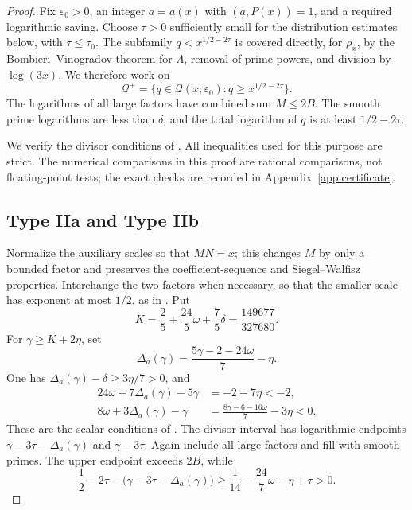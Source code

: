 \documentclass[11pt,reqno]{amsart}
\theoremstyle{definition}
\theoremstyle{remark}
\numberwithin{equation}{section}
\newcommand{\Qset}{\mathcal Q}
\newcommand{\tmax}{\tau_0}
\begin{document}
\begin{proof}
Fix $\varepsilon_0>0$, an integer $a=a(x)$ with $(a,P(x))=1$, and a
required logarithmic saving. Choose $\tau>0$ sufficiently small for the distribution estimates below, with
$\tau\le\tmax$. The subfamily $q<x^{1/2-2\tau}$ is covered directly,
for $\rho_x$, by the Bombieri--Vinogradov theorem for $\Lambda$, removal
of prime powers, and division by $\log(3x)$. We therefore
work on
\[
 \Qset^+=\{q\in\Qset(x;\varepsilon_0):q\ge x^{1/2-2\tau}\}.
\]
The logarithms of all large factors have combined sum $M\le2B$.
The smooth prime logarithms are less than $\delta$, and the total
logarithm of $q$ is at least $1/2-2\tau$.

We verify the divisor conditions of
\cite[Lemmas~3, 4, 6, and~7]{Stadlmann26}. All inequalities used for this purpose
are strict. The numerical comparisons in this proof are rational
comparisons, not floating-point tests; the exact checks are recorded in
Appendix~\ref{app:certificate}.

\subsection*{Type IIa and Type IIb}
Normalize the auxiliary scales so that $MN=x$; this changes $M$ by
only a bounded factor and preserves the coefficient-sequence and
Siegel--Walfisz properties. Interchange the two factors when necessary,
so that the smaller scale has exponent at most $1/2$, as in
\cite[Section~4.3, Case~II]{Stadlmann26}. Put
\begin{equation}\label{eq:K}
 K=\frac25+\frac{24}{5}\omega+\frac75\delta
   =\frac{149677}{327680}.
\end{equation}
For $\gamma\ge K+2\eta$, set
\[
 \Delta_a(\gamma)=\frac{5\gamma-2-24\omega}{7}-\eta.
\]
One has $\Delta_a(\gamma)-\delta\ge3\eta/7>0$, and
\begin{align*}
 24\omega+7\Delta_a(\gamma)-5\gamma&=-2-7\eta<-2,\\
 8\omega+3\Delta_a(\gamma)-\gamma
   &=\frac{8\gamma-6-16\omega}{7}-3\eta<0.
\end{align*}
These are the scalar conditions of \cite[Lemma~3]{Stadlmann26}.
The divisor interval has logarithmic endpoints
$\gamma-3\tau-\Delta_a(\gamma)$ and $\gamma-3\tau$.
Again include all large factors and fill with smooth primes. The upper
endpoint exceeds $2B$, while
\[
 \frac12-2\tau-\bigl(\gamma-3\tau-\Delta_a(\gamma)\bigr)
 \ge\frac1{14}-\frac{24}{7}\omega-\eta+\tau>0.
\]


\end{proof}
\end{document}
